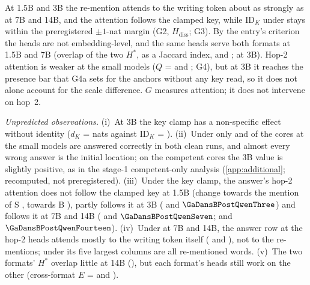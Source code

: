\begin{table}[!ht]
\centering
\small
\caption{\textbf{Re-mention attention} (preregistration G, part (a)). $E$: excess attention of the later mention of B to the writing token at the three selected heads; $F/E$: the share of it that follows the key clamp; $G$: excess attention of the answer position to the mention of B (hop~2) at its own three heads; $\mathrm{ID}_K$ and the non-specific key effect $d_K$ (nats) from the same eager run, scored in the casing the model emits. Heads selected on odd-indexed and evaluated on even-indexed cores of 150; 95\% bootstrap CIs. Under \fmtPost{}: G1 at 7B and 14B, G2 and G3 at 1.5B and 3B, G4 in all four; \fmtOpt{} is the gate and the reference of G3.}
\label{tab:attention}

\end{table}

At 1.5B and 3B the re-mention attends to the writing token about as strongly as at 7B and 14B, and the attention follows the clamped key, while $\mathrm{ID}_K$ under \fmtPost{} stays within the preregistered $\pm 1$-nat margin (G2, $H_{\mathrm{diss}}$; G3). By the entry's criterion the heads are not embedding-level, and the same heads serve both formats at 1.5B and 7B (overlap of the two $H^*$, as a Jaccard index, \GaJaccardQwenOnefive{} and \GaJaccardQwenSeven{}; \GaJaccardQwenThree{} at 3B). Hop-2 attention is weaker at the small models ($Q$ = \GfourbQQwenOnefive{} and \GfourbQQwenThree{}; G4), but at 3B it reaches the presence bar that G4a sets for the anchors without any key read, so it does not alone account for the scale difference. $G$ measures attention; it does not intervene on hop~2.

\emph{Unpredicted observations.} (i)~At 3B the key clamp has a non-specific effect without identity ($d_K$ = \GaDKCapPostQwenThree{} nats against $\mathrm{ID}_K$ = \GaIDKCapPostQwenThree{}). (ii)~Under \fmtPost{} only \GaCompetentPostQwenOnefive{} and \GaCompetentPostQwenThree{} of the cores at the small models are answered correctly in both clean runs, and almost every wrong answer is the initial location; on the competent cores the 3B value is slightly positive, as in the stage-1 competent-only analysis (\cref{app:additional}; recomputed, not preregistered). (iii)~Under the key clamp, the answer's hop-2 attention does not follow the clamped key at 1.5B (change towards the mention of S \GaDansSPostQwenOnefive{}, towards B \GaDansBPostQwenOnefive{}), partly follows it at 3B (\GaDansSPostQwenThree{} and $\GaDansBPostQwenThree$) and follows it at 7B and 14B (\GaDansSPostQwenSeven{} and $\GaDansBPostQwenSeven$; \GaDansSPostQwenFourteen{} and $\GaDansBPostQwenFourteen$). (iv)~Under \fmtPost{} at 7B and 14B, the answer row at the hop-2 heads attends mostly to the writing token itself (\GaAnsToPQwenSeven{} and \GaAnsToPQwenFourteen{}), not to the re-mentions; under \fmtOpt{} its five largest columns are all re-mentioned words. (v)~The two formats' $H^*$ overlap little at 14B (\GaJaccardQwenFourteen{}), but each format's heads still work on the other (cross-format $E$ = \GaEcrossPostQwenFourteen{} and \GaEcrossOptQwenFourteen{}).

